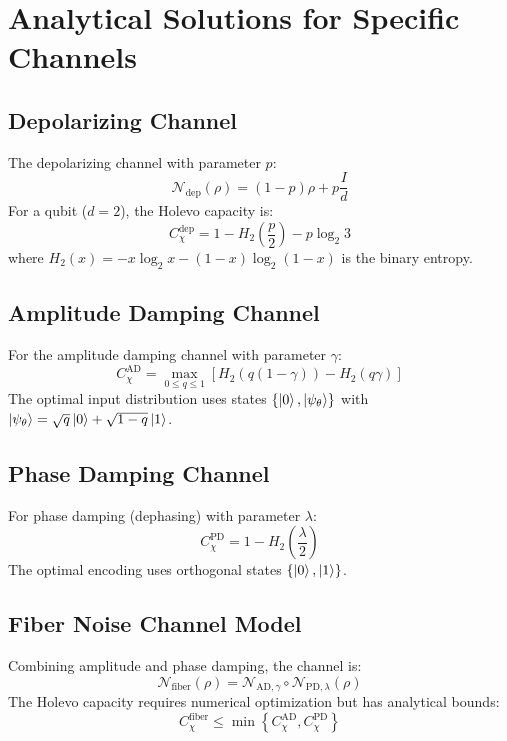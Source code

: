 \documentclass[12pt]{article}
\begin{document}
\section{Analytical Solutions for Specific Channels}

\subsection{Depolarizing Channel}
The depolarizing channel with parameter $p$:
\[
\mathcal{N}_{\text{dep}}(\rho) = (1-p)\rho + p \frac{I}{d}
\]
For a qubit ($d=2$), the Holevo capacity is:
\begin{equation}
C_{\chi}^{\text{dep}} = 1 - H_2\left(\frac{p}{2}\right) - p \log_2 3
\label{eq:dep_capacity}
\end{equation}
where $H_2(x) = -x\log_2 x - (1-x)\log_2(1-x)$ is the binary entropy.

\subsection{Amplitude Damping Channel}
For the amplitude damping channel with parameter $\gamma$:
\begin{equation}
C_{\chi}^{\text{AD}} = \max_{0 \leq q \leq 1} \left[ H_2(q(1-\gamma)) - H_2(q\gamma) \right]
\label{eq:ad_capacity}
\end{equation}
The optimal input distribution uses states $\{\ket{0}, \ket{\psi_\theta}\}$ with $\ket{\psi_\theta} = \sqrt{q}\ket{0} + \sqrt{1-q}\ket{1}$.

\subsection{Phase Damping Channel}
For phase damping (dephasing) with parameter $\lambda$:
\begin{equation}
C_{\chi}^{\text{PD}} = 1 - H_2\left(\frac{\lambda}{2}\right)
\label{eq:pd_capacity}
\end{equation}
The optimal encoding uses orthogonal states $\{\ket{0}, \ket{1}\}$.

\subsection{Fiber Noise Channel Model}
Combining amplitude and phase damping, the channel is:
\[
\mathcal{N}_{\text{fiber}}(\rho) = \mathcal{N}_{\text{AD},\gamma} \circ \mathcal{N}_{\text{PD},\lambda}(\rho)
\]
The Holevo capacity requires numerical optimization but has analytical bounds:
\begin{equation}
C_{\chi}^{\text{fiber}} \leq \min\left\{C_{\chi}^{\text{AD}}, C_{\chi}^{\text{PD}}\right\}
\label{eq:fiber_bound}
\end{equation}
\end{document}

